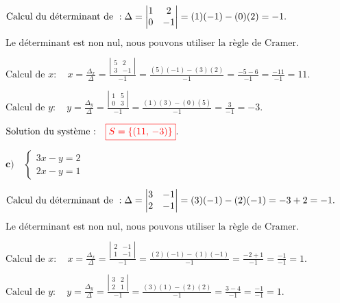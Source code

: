 \documentclass[12pt,a4paper]{article}
\begin{document}
\(
\text{Calcul du déterminant de } : \\
\Delta = \left| \begin{matrix} 1 & 2 \\ 0 & -1 \end{matrix} \right| = (1)(-1) - (0)(2) = -1.
\)

\(
\text{Le déterminant est non nul, nous pouvons utiliser la règle de Cramer.}
\)

\(
\text{Calcul de } x : \quad
x = \frac{\Delta_{x}}{\Delta} = \frac{\left| \begin{matrix} 5 & 2 \\ 3 & -1 \end{matrix} \right|}{-1}
= \frac{(5)(-1) - (3)(2)}{-1} = \frac{-5 - 6}{-1} = \frac{-11}{-1} = 11.
\)

\(
\text{Calcul de } y : \quad
y = \frac{\Delta_{y}}{\Delta} = \frac{\left| \begin{matrix} 1 & 5 \\ 0 & 3 \end{matrix} \right|}{-1}
= \frac{(1)(3) - (0)(5)}{-1} = \frac{3}{-1} = -3.
\)

\(
\text{Solution du système :} \quad
\textcolor{red}{\boxed{S=\left\lbrace  \left( 11, \, -3 \right)  \right\rbrace }}.
\)

\(\textbf{c)} \quad
\begin{cases}
3x - y = 2 \\
2x - y = 1
\end{cases}
\)


\(
\text{Calcul du déterminant de } : \\
\Delta = \left| \begin{matrix} 3 & -1 \\ 2 & -1 \end{matrix} \right| = (3)(-1) - (2)(-1) = -3 + 2 = -1.
\)

\(
\text{Le déterminant est non nul, nous pouvons utiliser la règle de Cramer.}
\)

\(
\text{Calcul de } x : \quad
x = \frac{\Delta_{x}}{\Delta} = \frac{\left| \begin{matrix} 2 & -1 \\ 1 & -1 \end{matrix} \right|}{-1}
= \frac{(2)(-1) - (1)(-1)}{-1} = \frac{-2 + 1}{-1} = \frac{-1}{-1} = 1.
\)

\(
\text{Calcul de } y : \quad
y = \frac{\Delta_{y}}{\Delta} = \frac{\left| \begin{matrix} 3 & 2 \\ 2 & 1 \end{matrix} \right|}{-1}
= \frac{(3)(1) - (2)(2)}{-1} = \frac{3 - 4}{-1} = \frac{-1}{-1} = 1.
\)
\end{document}
